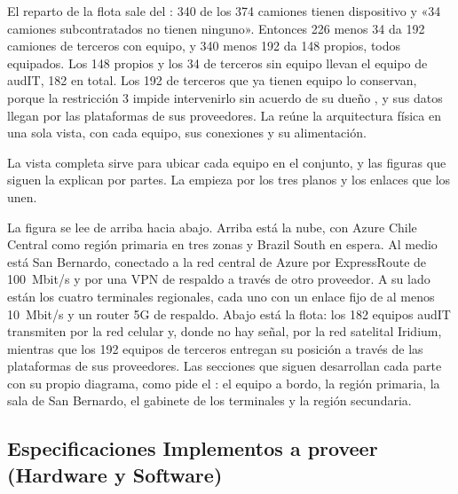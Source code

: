 El reparto de la flota sale del : 340 de los 374 camiones tienen dispositivo y
«34 camiones subcontratados no tienen ninguno». Entonces 226 menos 34 da 192 camiones de terceros con
equipo, y 340 menos 192 da 148 propios, todos equipados. Los 148 propios y los 34 de terceros sin
equipo llevan el equipo de audIT, 182 en total. Los 192 de terceros que ya tienen equipo lo conservan,
porque la restricción 3 impide intervenirlo sin acuerdo de su dueño , y sus
datos llegan por las plataformas de sus proveedores. La  reúne la
arquitectura física en una sola vista, con cada equipo, sus conexiones y su alimentación.


La vista completa sirve para ubicar cada equipo en el conjunto, y las figuras que siguen la explican por
partes. La  empieza por los tres planos y los enlaces que los unen.


La figura se lee de arriba hacia abajo. Arriba está la nube, con Azure Chile Central como región
primaria en tres zonas y Brazil South en espera. Al medio está San Bernardo, conectado a la red central
de Azure por ExpressRoute de 100~Mbit/s y por una VPN de respaldo a través de otro proveedor. A su
lado están los cuatro terminales regionales, cada uno con un enlace fijo de al menos 10~Mbit/s y un
router 5G de respaldo. Abajo está la flota: los 182 equipos audIT transmiten por la red celular y,
donde no hay señal, por la red satelital Iridium, mientras que los 192 equipos de terceros entregan su
posición a través de las plataformas de sus proveedores. Las secciones que siguen desarrollan cada
parte con su propio diagrama, como pide el : el equipo a bordo, la región
primaria, la sala de San Bernardo, el gabinete de los terminales y la región secundaria.

\subsection{Especificaciones Implementos a proveer (Hardware y Software)}\label{sec:4-implementos}

